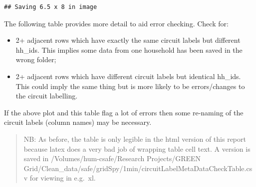 \documentclass[]{article}
\providecommand{\tightlist}{%
  \setlength{\itemsep}{0pt}\setlength{\parskip}{0pt}}
\begin{document}
\begin{verbatim}
## Saving 6.5 x 8 in image
\end{verbatim}

The following table provides more detail to aid error checking. Check
for:

\begin{itemize}
\tightlist
\item
  2+ adjacent rows which have exactly the same circuit labels but
  different hh\_ids. This implies some data from one household has been
  saved in the wrong folder;
\item
  2+ adjacent rows which have different circuit labels but identical
  hh\_ids. This could imply the same thing but is more likely to be
  errors/changes to the circuit labelling.
\end{itemize}

If the above plot and this table flag a lot of errors then some
re-naming of the circuit labels (column names) may be necessary.

\begin{quote}
NB: As before, the table is only legible in the html version of this
report because latex does a very bad job of wrapping table cell text. A
version is saved in /Volumes/hum-csafe/Research Projects/GREEN
Grid/Clean\_data/safe/gridSpy/1min/circuitLabelMetaDataCheckTable.csv
for viewing in e.g.~xl.
\end{quote}
\end{document}
